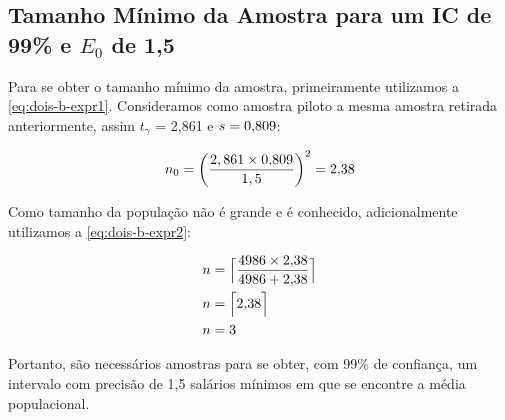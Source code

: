 \subsection{Tamanho Mínimo da Amostra para um IC de 99\% e $E_0$ de 1,5}

	Para se obter o tamanho mínimo da amostra, primeiramente utilizamos a
	\autoref{eq:dois-b-expr1}. Consideramos como amostra piloto a mesma
	amostra retirada anteriormente, assim $t_{\gamma}$ = 2,861 e $s = \num{0.809}$:

	\begin{align*}
		n_0 = \left (\frac{2,861 \times \num{0.809}}{1,5} \right)^2 = \num{2.38}
	\end{align*}

	Como tamanho da população não é grande e é conhecido, adicionalmente
	utilizamos a \autoref{eq:dois-b-expr2}:

	\begin{align*}
			n &= \Big\lceil \frac{\num{4986} \times \num{2.38}}{\num{4986} + \num{2.38}} \Big\rceil \\
			n &= \Big\lceil \num{2.38} \Big\rceil \\
			n &= \num{3}
	\end{align*}

Portanto, são necessários \TRESnZeroCorrigidoRounded amostras para se obter, com 99\% de confiança,
um intervalo com precisão de 1,5 salários mínimos em que se encontre a média populacional.
